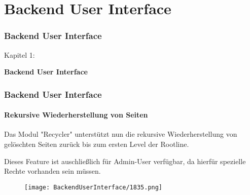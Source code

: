 %

\section{Backend User Interface}
\begin{frame}[fragile]
	\frametitle{Backend User Interface}

	\begin{center}\huge{Kapitel 1:}\end{center}
	\begin{center}\huge{\color{typo3darkgrey}\textbf{Backend User Interface}}\end{center}

\end{frame}

\begin{frame}[fragile]
	\frametitle{Backend User Interface}
	\framesubtitle{Rekursive Wiederherstellung von Seiten}

	Das Modul "Recycler" unterstützt nun die rekursive Wiederherstellung von gelöschten Seiten zurück bis zum ersten Level der Rootline.

	Dieses Feature ist auschließlich für Admin-User verfügbar, da hierfür spezielle Rechte vorhanden sein müssen.

	\begin{figure}
		\texttt{[image: BackendUserInterface/1835.png]}
	\end{figure}

\end{frame}

